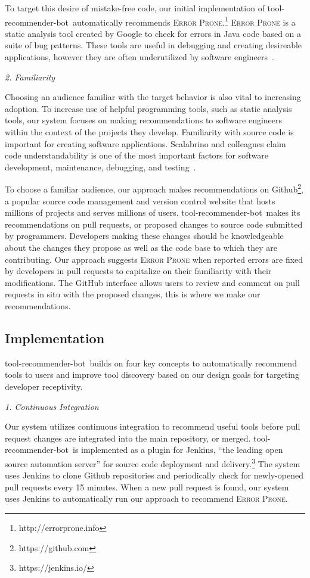 \documentclass[conference]{IEEEtran}
\newcommand{\tool}{tool-recommender-bot}
\newcommand{\pseudosubsection}[1]{\vspace{2mm} {\it #1}}
\begin{document}
To target this desire of mistake-free code, our initial implementation of \tool~automatically recommends \textsc{Error Prone}.\footnote{http://errorprone.info} \textsc{Error Prone} is a static analysis tool created by Google to check for errors in Java code based on a suite of bug patterns. These tools are useful in debugging and creating desireable applications, however they are often underutilized by software engineers~\cite{Johnson2013Why}. 

\pseudosubsection{2. Familiarity}

Choosing an audience familiar with the target behavior is also vital to increasing adoption. To increase use of helpful programming tools, such as static analysis tools, our system focuses on making recommendations to software engineers within the context of the projects they develop. Familiarity with source code is important for creating software applications. Scalabrino and colleagues claim code understandability is one of the most important factors for software development, maintenance, debugging, and testing~\cite{Scalabrino2017Understandability}.

To choose a familiar audience, our approach makes recommendations on Github\footnote{https://github.com}, a popular source code management and version control website that hosts millions of projects and serves millions of users. \tool~makes its recommendations on pull requests, or proposed changes to source code submitted by programmers. Developers making these changes should be knowledgeable about the changes they propose as well as the code base to which they are contributing. Our approach suggests \textsc{Error Prone} when reported errors are fixed by developers in pull requests to capitalize on their familiarity with their modifications. The GitHub interface allows users to review and comment on pull requests in situ with the proposed changes, this is where we make our recommendations.

\subsection{Implementation}

\tool~builds on four key concepts to automatically recommend tools to users and improve tool discovery based on our design goals for targeting developer receptivity.

\pseudosubsection{1. Continuous Integration}

Our system utilizes continuous integration to recommend useful tools before pull request changes are integrated into the main repository, or merged. \tool~is implemented as a plugin for Jenkins, ``the leading open source automation server'' for source code deployment and delivery.\footnote{https://jenkins.io/} The system uses Jenkins to clone Github repositories and periodically check for newly-opened pull requests every 15 minutes. When a new pull request is found, our system uses Jenkins to automatically run our approach to recommend \textsc{Error Prone}.
\end{document}
